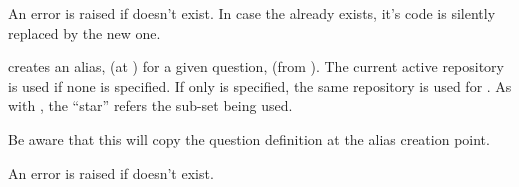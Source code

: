 \documentclass[10pt]{article}
\begin{document}
\begin{tsremark}
An error is raised if  doesn't exist. In case the  already exists, it's code is silently replaced by the new one.
\end{tsremark}


\begin{codedescribe}[code,update={2025/04/25}]{}
\begin{codesyntax}%
\end{codesyntax}
 creates an alias,  (at ) for a given question,  (from ). The current active repository is used if none is specified. If only  is specified, the same repository is used for . As with , the ``star'' refers the sub-set  being used.
\end{codedescribe}


\begin{tsremark}
Be aware that this will copy the question definition at the alias creation point.
\end{tsremark}

\begin{tsremark}
An error is raised if  doesn't exist.
\end{tsremark}
\end{document}
